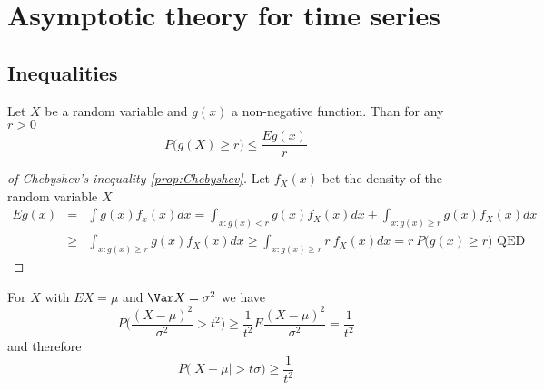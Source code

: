 

\clearpage

\section{Asymptotic theory for time series}\label{sec:Asymptotics}

\subsection{Inequalities}\label{sec:Inequalities}

\begin{proposition}\label{prop:Chebyshev}
Let $X$ be a random variable and $g(x)$ a non-negative function. Than for any $r>0$
\begin{equation}
P\Big(g(X) \ge r \Big) \le \frac{Eg(x)}{r}
\end{equation}
\end{proposition}

\begin{proof}[of Chebyshev's inequality \ref{prop:Chebyshev}]
Let $f_X(x)$ bet the density of the random variable $X$
\begin{eqnarray*}
Eg(x) & = & \int g(x) f_x(x) dx 
 =  \int_{x:g(x) < r} g(x) f_X(x) dx + \int_{x:g(x) \ge r} g(x) f_X(x) dx \\
& \ge &  \int_{x:g(x) \ge r} g(x) f_X(x) dx 
\ge \int_{x:g(x) \ge r} r \ f_X(x) dx = r \ P\Big(g(x) \ge r \Big) \text{ QED}
\end{eqnarray*}
\end{proof}

\begin{example}
For $X$ with $EX = \mu$ and $\Var X = \sigma^2$ we have
\begin{equation}
P\Big(\frac{(X-\mu)^2}{\sigma^2} > t^2 \Big) \ge \frac{1}{t^2} E\frac{(X-\mu)^2}{\sigma^2} = \frac{1}{t^2}
\end{equation}
and therefore
\begin{equation}
P\Big(|X-\mu| > t\sigma \Big) \ge \frac{1}{t^2}
\end{equation}
\end{example}

